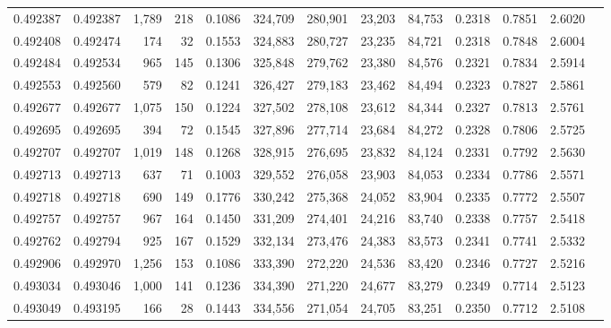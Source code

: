 \begin{tabular}{rrrrrrrrrrrrr}
0.492387 & 0.492387 & 1,789 &   218 &                                     0.1086 & 324,709 & 280,901 &  23,203 &  84,753 & 0.2318 & 0.7851 & 2.6020 \\
0.492408 & 0.492474 &   174 &    32 &                                     0.1553 & 324,883 & 280,727 &  23,235 &  84,721 & 0.2318 & 0.7848 & 2.6004 \\
0.492484 & 0.492534 &   965 &   145 &                                     0.1306 & 325,848 & 279,762 &  23,380 &  84,576 & 0.2321 & 0.7834 & 2.5914 \\
0.492553 & 0.492560 &   579 &    82 &                                     0.1241 & 326,427 & 279,183 &  23,462 &  84,494 & 0.2323 & 0.7827 & 2.5861 \\
0.492677 & 0.492677 & 1,075 &   150 &                                     0.1224 & 327,502 & 278,108 &  23,612 &  84,344 & 0.2327 & 0.7813 & 2.5761 \\
0.492695 & 0.492695 &   394 &    72 &                                     0.1545 & 327,896 & 277,714 &  23,684 &  84,272 & 0.2328 & 0.7806 & 2.5725 \\
0.492707 & 0.492707 & 1,019 &   148 &                                     0.1268 & 328,915 & 276,695 &  23,832 &  84,124 & 0.2331 & 0.7792 & 2.5630 \\
0.492713 & 0.492713 &   637 &    71 &                                     0.1003 & 329,552 & 276,058 &  23,903 &  84,053 & 0.2334 & 0.7786 & 2.5571 \\
0.492718 & 0.492718 &   690 &   149 &                                     0.1776 & 330,242 & 275,368 &  24,052 &  83,904 & 0.2335 & 0.7772 & 2.5507 \\
0.492757 & 0.492757 &   967 &   164 &                                     0.1450 & 331,209 & 274,401 &  24,216 &  83,740 & 0.2338 & 0.7757 & 2.5418 \\
0.492762 & 0.492794 &   925 &   167 &                                     0.1529 & 332,134 & 273,476 &  24,383 &  83,573 & 0.2341 & 0.7741 & 2.5332 \\
0.492906 & 0.492970 & 1,256 &   153 &                                     0.1086 & 333,390 & 272,220 &  24,536 &  83,420 & 0.2346 & 0.7727 & 2.5216 \\
0.493034 & 0.493046 & 1,000 &   141 &                                     0.1236 & 334,390 & 271,220 &  24,677 &  83,279 & 0.2349 & 0.7714 & 2.5123 \\
0.493049 & 0.493195 &   166 &    28 &                                     0.1443 & 334,556 & 271,054 &  24,705 &  83,251 & 0.2350 & 0.7712 & 2.5108 \\

\end{tabular}
